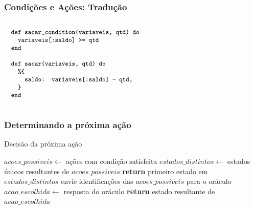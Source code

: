\documentclass{beamer}
\begin{document}
\begin{frame}
  \frametitle{Condições e Ações: Tradução}
  $\progfig{
  ~~def sacar\_condition(variaveis, qtd) do\\
  ~~~~variaveis[:saldo] >= qtd\\
  ~~end\\\\
  ~~def sacar(variaveis, qtd) do\\
  ~~~~\%\{\\
  ~~~~~~saldo: variaveis[:saldo] - qtd,\\
  ~~~~\}\\
  ~~end
  }$
\end{frame}

\begin{frame}
  \frametitle{Determinando a próxima ação}
  \begin{algorithm}[H]
    \caption{Decisão da próxima ação}\label{alg:decide-action}
    \begin{algorithmic}[1]
      \State $acoes\_possiveis\gets$ ações com condição satisfeita
      \State $estados\_distintos\gets$ estados únicos resultantes de $acoes\_possiveis$
      \State \textbf{return} primeiro estado em $estados\_distintos$
      \Else{}
      \State envie identificações das $acoes\_possiveis$ para o oráculo
      \State $acao\_escolhida\gets$ resposta do oráculo
      \State \textbf{return} estado resultante de $acao\_escolhida$
      \EndIf
      \EndProcedure
    \end{algorithmic}
  \end{algorithm}
\end{frame}

\end{document}
